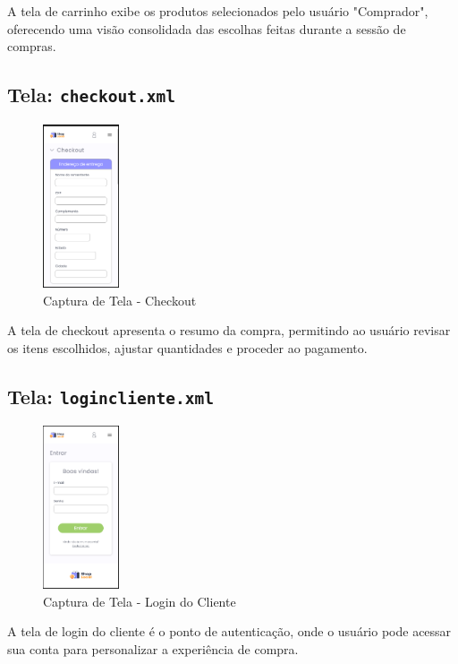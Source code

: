 \documentclass[
	12pt,				%
	openright,			%
	twoside,			%
	a4paper,			%
	english,			%
	brazil				%
	]{abntex2}
\begin{document}
A tela de carrinho exibe os produtos selecionados pelo usuário "Comprador", oferecendo uma visão consolidada das escolhas feitas durante a sessão de compras.

\subsection{Tela: \texttt{checkout.xml}}

\begin{figure}[htb]
    \centering
    \includegraphics[width=0.2\textwidth]{img/checkout}
    \caption{Captura de Tela - Checkout}
\end{figure}

A tela de checkout apresenta o resumo da compra, permitindo ao usuário revisar os itens escolhidos, ajustar quantidades e proceder ao pagamento.

\subsection{Tela: \texttt{logincliente.xml}}

\begin{figure}[htb]
    \centering
    \includegraphics[width=0.2\textwidth]{img/logincliente}
    \caption{Captura de Tela - Login do Cliente}
\end{figure}

A tela de login do cliente é o ponto de autenticação, onde o usuário pode acessar sua conta para personalizar a experiência de compra.
\end{document}
